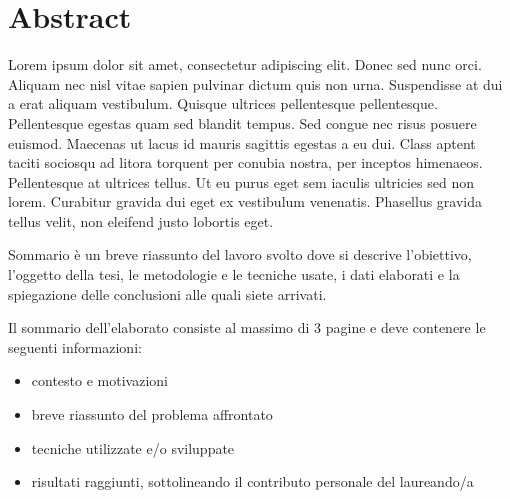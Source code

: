 \chapter*{Abstract} %
\label{abstract}


Lorem ipsum dolor sit amet, consectetur adipiscing elit. Donec sed nunc orci. Aliquam nec nisl vitae sapien pulvinar dictum quis non urna. Suspendisse at dui a erat aliquam vestibulum. Quisque ultrices pellentesque pellentesque. Pellentesque egestas quam sed blandit tempus. Sed congue nec risus posuere euismod. Maecenas ut lacus id mauris sagittis egestas a eu dui. Class aptent taciti sociosqu ad litora torquent per conubia nostra, per inceptos himenaeos. Pellentesque at ultrices tellus. Ut eu purus eget sem iaculis ultricies sed non lorem. Curabitur gravida dui eget ex vestibulum venenatis. Phasellus gravida tellus velit, non eleifend justo lobortis eget.


  Sommario è un breve riassunto del lavoro svolto dove si descrive l'obiettivo, l'oggetto della tesi, le 
metodologie e le tecniche usate, i dati elaborati e la spiegazione delle conclusioni alle quali siete arrivati.  

Il sommario dell’elaborato consiste al massimo di 3 pagine e deve contenere le seguenti informazioni:
\begin{itemize}
  \item contesto e motivazioni 
  \item breve riassunto del problema affrontato
  \item tecniche utilizzate e/o sviluppate
  \item risultati raggiunti, sottolineando il contributo personale del laureando/a
\end{itemize}





